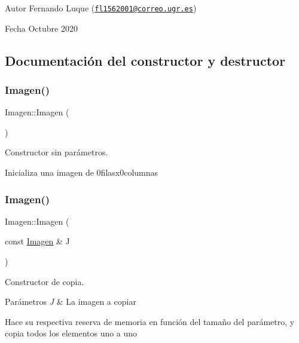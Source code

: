\begin{DoxyAuthor}{Autor}
Fernando Luque (\href{mailto:fl1562001@correo.ugr.es}{\tt fl1562001@correo.\+ugr.\+es}) 
\end{DoxyAuthor}
\begin{DoxyDate}{Fecha}
Octubre 2020 
\end{DoxyDate}


\subsection{Documentación del constructor y destructor}
\mbox{\label{classImagen_ab2e649aa7a105155c7bfdb846abf0528}} 
\subsubsection{\texorpdfstring{Imagen()}{Imagen()}\hspace{0.1cm}{\footnotesize\ttfamily [1/4]}}
{\footnotesize\ttfamily Imagen\+::\+Imagen (\begin{DoxyParamCaption}{ }\end{DoxyParamCaption})}



Constructor sin parámetros. 

Inicializa una imagen de 0filasx0columnas \mbox{\label{classImagen_a70437d2848ae5b030ee17cf79651a8b5}} 
\subsubsection{\texorpdfstring{Imagen()}{Imagen()}\hspace{0.1cm}{\footnotesize\ttfamily [2/4]}}
{\footnotesize\ttfamily Imagen\+::\+Imagen (\begin{DoxyParamCaption}\item[{const \hyperlink{classImagen}{Imagen} \&}]{J }\end{DoxyParamCaption})}



Constructor de copia. 


\begin{DoxyParams}{Parámetros}
{\em J} & La imagen a copiar\\
\hline
\end{DoxyParams}
Hace su respectiva reserva de memoria en función del tamaño del parámetro, y copia todos los elementos uno a uno \mbox{\label{classImagen_ad4943ff0e2de31d4c25a879030f3ebf2}} 
